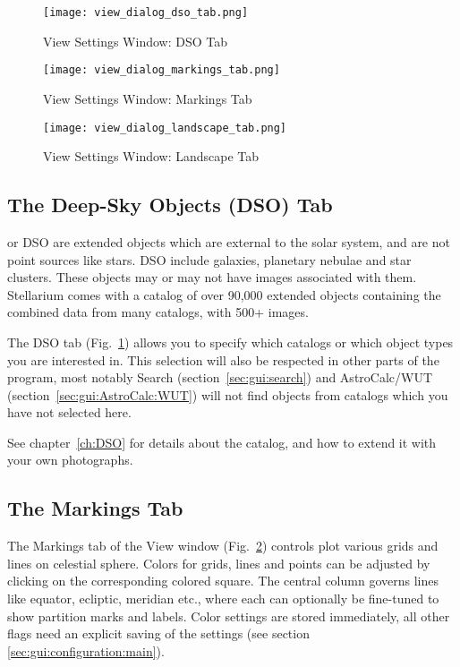\begin{figure}[p]
\centering\texttt{[image: view\_dialog\_dso\_tab.png]}
\caption{View Settings Window: DSO Tab}
\label{fig:gui:view:dso}
\end{figure}

\begin{figure}[p]
\centering\texttt{[image: view\_dialog\_markings\_tab.png]}
\caption{View Settings Window: Markings Tab}
\label{fig:gui:view:markings}
\end{figure}

\begin{figure}[p]
\centering\texttt{[image: view\_dialog\_landscape\_tab.png]}
\caption{View Settings Window: Landscape Tab}
\label{fig:gui:view:landscape}
\end{figure}

\subsection{The Deep-Sky Objects (DSO) Tab}
\label{sec:gui:view:dso}

 or DSO are extended objects which are
external to the solar system, and are not point sources like stars.
DSO include galaxies, planetary nebulae and star clusters. These
objects may or may not have images associated with them. Stellarium
comes with a catalog of over 90,000 extended objects containing
the combined data from many catalogs, with 500+ images.  

The DSO tab (Fig.~\ref{fig:gui:view:dso}) allows you to specify which 
catalogs or which object types you are interested in. This selection 
will also be respected in other parts of the program, 
most notably Search (section~\ref{sec:gui:search}) and 
AstroCalc/WUT (section~\ref{sec:gui:AstroCalc:WUT}) 
will not find objects from catalogs which you have not selected here. 

See chapter~\ref{ch:DSO} for details about the catalog, 
and how to extend it with your own photographs.


\subsection{The Markings Tab}
\label{sec:gui:view:markings}

\noindent The Markings tab of the View window
(Fig.~\ref{fig:gui:view:markings}) controls plot various grids and
lines on celestial sphere. Colors for grids, lines and points can be
adjusted by clicking on the corresponding colored square.  The central
column governs lines like equator, ecliptic, meridian etc., where each
can optionally be fine-tuned to  show partition
marks and labels. Color settings are stored immediately, all other
flags need an explicit saving of the settings (see section
\ref{sec:gui:configuration:main}).

